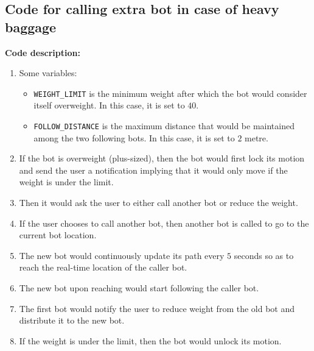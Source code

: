\documentclass{article}
\begin{document}
\subsection{Code for calling extra bot in case of heavy baggage}
\label{code:c}
\textbf{Code description: }
\begin{enumerate}
\item Some variables:
\begin{itemize}
    \item \lstinline[language=Python]{WEIGHT_LIMIT} is the minimum weight after which the bot would consider itself overweight. In this case, it is set to $40$.
    \item \lstinline[language=Python]{FOLLOW_DISTANCE} is the maximum distance that would be maintained among the two following bots. In this case, it is set to $2$ metre.
\end{itemize}
\item If the bot is overweight (plus-sized), then the bot would first lock its motion and send the user a notification implying that it would only move if the weight is under the limit.
\item Then it would ask the user to either call another bot or reduce the weight.
\item If the user chooses to call another bot, then another bot is called to go to the current bot location.
\item The new bot would continuously update its path every $5$ seconds so as to reach the real-time location of the caller bot.
\item The new bot upon reaching would start following the caller bot.
\item The first bot would notify the user to reduce weight from the old bot and distribute it to the new bot.
\item If the weight is under the limit, then the bot would unlock its motion.
\end{enumerate}
\end{document}
